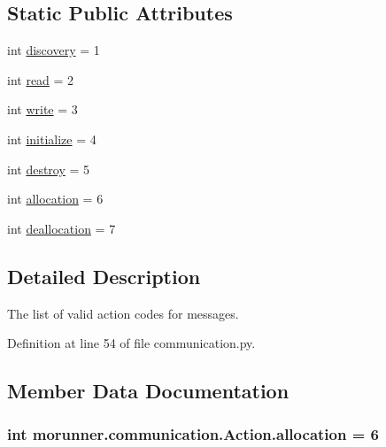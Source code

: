\subsection*{Static Public Attributes}
\begin{DoxyCompactItemize}
\item 
int \hyperlink{classmorunner_1_1communication_1_1Action_a367a02befe76df874fe36b7342873f88}{discovery} = 1
\item 
int \hyperlink{classmorunner_1_1communication_1_1Action_a9e067338328ab2a5f6084c24b6091e0c}{read} = 2
\item 
int \hyperlink{classmorunner_1_1communication_1_1Action_aed47c16770d1f072b7a7d5bb6bfc0e13}{write} = 3
\item 
int \hyperlink{classmorunner_1_1communication_1_1Action_a4ecc5485449669bbd974615fe783577d}{initialize} = 4
\item 
int \hyperlink{classmorunner_1_1communication_1_1Action_aa749211a8116f9320662c45442f2b09f}{destroy} = 5
\item 
int \hyperlink{classmorunner_1_1communication_1_1Action_a0eac527678033a524b4077972d1450b4}{allocation} = 6
\item 
int \hyperlink{classmorunner_1_1communication_1_1Action_ad318c65952cf6ea310ffe8a755ae822c}{deallocation} = 7
\end{DoxyCompactItemize}


\subsection{Detailed Description}
\begin{DoxyVerb}The list of valid action codes for messages.
\end{DoxyVerb}
 

Definition at line 54 of file communication.\+py.



\subsection{Member Data Documentation}
\hypertarget{classmorunner_1_1communication_1_1Action_a0eac527678033a524b4077972d1450b4}{}
\subsubsection[{allocation}]{\setlength{\rightskip}{0pt plus 5cm}int morunner.\+communication.\+Action.\+allocation = 6\hspace{0.3cm}{\ttfamily [static]}}\label{classmorunner_1_1communication_1_1Action_a0eac527678033a524b4077972d1450b4}


